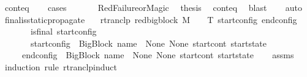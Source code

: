 \begin{isabellebody}
\ cont{\isacharunderscore}{\kern0pt}eq\isanewline
\ \ \isamarkupfalse%
\ cases\ \isanewline
\ \ \ \ \isamarkupfalse%
\ RedFailure{\isacharunderscore}{\kern0pt}or{\isacharunderscore}{\kern0pt}Magic\ \isamarkupfalse%
\ {\isacharquery}{\kern0pt}thesis\ \isamarkupfalse%
\ cont{\isacharunderscore}{\kern0pt}eq\ \isamarkupfalse%
\ blast\isanewline
\ \ \isamarkupfalse%
\ auto\isanewline
{}\isamarkupfalse%
%
\endisatagproof
{\isafoldproof}%
%
\isadelimproof
\isanewline
%
\endisadelimproof
\isanewline
{}\isamarkupfalse%
\ final{\isacharunderscore}{\kern0pt}is{\isacharunderscore}{\kern0pt}static{\isacharunderscore}{\kern0pt}propagate{\isacharcolon}{\kern0pt}\isanewline
\ \ \ {\isachardoublequoteopen}rtranclp\ {\isacharparenleft}{\kern0pt}red{\isacharunderscore}{\kern0pt}bigblock\ M\ {\isasymLambda}\ {\isasymGamma}\ {\isasymOmega}\ T{\isacharparenright}{\kern0pt}\ start{\isacharunderscore}{\kern0pt}config\ end{\isacharunderscore}{\kern0pt}config{\isachardoublequoteclose}\ \isanewline
\ \ \ \ \ \ \ {\isachardoublequoteopen}is{\isacharunderscore}{\kern0pt}final\ start{\isacharunderscore}{\kern0pt}config{\isachardoublequoteclose}\isanewline
\ \ \ \ \ \ \ {\isachardoublequoteopen}start{\isacharunderscore}{\kern0pt}config\ {\isacharequal}{\kern0pt}\ {\isacharparenleft}{\kern0pt}{\isacharparenleft}{\kern0pt}BigBlock\ name\ {\isacharbrackleft}{\kern0pt}{\isacharbrackright}{\kern0pt}\ None\ None{\isacharparenright}{\kern0pt}{\isacharcomma}{\kern0pt}\ start{\isacharunderscore}{\kern0pt}cont{\isacharcomma}{\kern0pt}\ start{\isacharunderscore}{\kern0pt}state{\isacharparenright}{\kern0pt}{\isachardoublequoteclose}\isanewline
\ \ \ \ \ {\isachardoublequoteopen}end{\isacharunderscore}{\kern0pt}config\ {\isacharequal}{\kern0pt}\ {\isacharparenleft}{\kern0pt}{\isacharparenleft}{\kern0pt}BigBlock\ name\ {\isacharbrackleft}{\kern0pt}{\isacharbrackright}{\kern0pt}\ None\ None{\isacharparenright}{\kern0pt}{\isacharcomma}{\kern0pt}\ start{\isacharunderscore}{\kern0pt}cont{\isacharcomma}{\kern0pt}\ start{\isacharunderscore}{\kern0pt}state{\isacharparenright}{\kern0pt}{\isachardoublequoteclose}\isanewline
%
\isadelimproof
\ \ %
\endisadelimproof
%
\isatagproof
{}\isamarkupfalse%
\ assms\isanewline
{}\isamarkupfalse%
\ {\isacharparenleft}{\kern0pt}induction\ rule{\isacharcolon}{\kern0pt}\ rtranclp{\isachardot}{\kern0pt}induct{\isacharparenright}{\kern0pt}\isanewline

\end{isabellebody}
